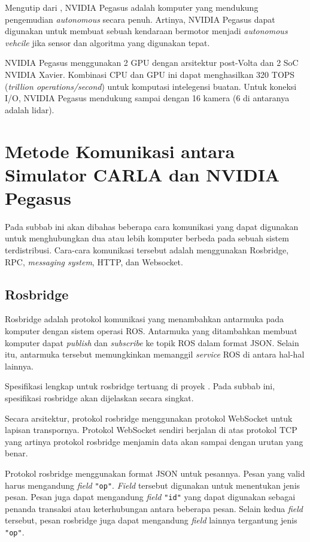 Mengutip dari \parencite{oh_2017}, NVIDIA Pegasus adalah komputer yang
mendukung pengemudian \textit{autonomous} secara penuh. Artinya, NVIDIA Pegasus
dapat digunakan untuk membuat sebuah kendaraan bermotor menjadi
\textit{autonomous vehcile} jika sensor dan algoritma yang digunakan tepat.

NVIDIA Pegasus menggunakan 2 GPU dengan arsitektur post-Volta dan 2 SoC NVIDIA
Xavier. Kombinasi CPU dan GPU ini dapat menghasilkan 320 TOPS (\textit{trillion
      operations/second}) untuk komputasi intelegensi buatan. Untuk koneksi I/O,
NVIDIA Pegasus mendukung sampai dengan 16 kamera (6 di antaranya adalah lidar).


\section{Metode Komunikasi antara Simulator CARLA dan NVIDIA Pegasus}

Pada subbab ini akan dibahas beberapa cara komunikasi yang dapat digunakan
untuk menghubungkan dua atau lebih komputer berbeda pada sebuah sistem
terdistribusi. Cara-cara komunikasi tersebut adalah menggunakan Rosbridge, RPC,
\textit{messaging system}, HTTP, dan Websocket.

\subsection{Rosbridge}

Rosbridge adalah protokol komunikasi yang menambahkan antarmuka pada komputer
dengan sistem operasi ROS. Antarmuka yang ditambahkan membuat komputer dapat
\textit{publish} dan \textit{subscribe} ke topik ROS dalam format JSON. Selain
itu, antarmuka tersebut memungkinkan memanggil \textit{service} ROS di antara
hal-hal lainnya.

Spesifikasi lengkap untuk rosbridge tertuang di proyek \parencite{ros_bridge}.
Pada subbab ini, spesifikasi rosbridge akan dijelaskan secara singkat.

Secara arsitektur, protokol rosbridge menggunakan protokol WebSocket untuk
lapisan transpornya. Protokol WebSocket sendiri berjalan di atas protokol TCP
yang artinya protokol rosbridge menjamin data akan sampai dengan urutan yang
benar.

Protokol rosbridge menggunakan format JSON untuk pesannya. Pesan yang valid
harus mengandung \textit{field} \texttt{"op"}. \textit{Field} tersebut
digunakan untuk menentukan jenis pesan. Pesan juga dapat mengandung
\textit{field} \texttt{"id"} yang dapat digunakan sebagai penanda transaksi
atau keterhubungan antara beberapa pesan. Selain kedua \textit{field} tersebut,
pesan rosbridge juga dapat mengandung \textit{field} lainnya tergantung jenis
\texttt{"op"}.

